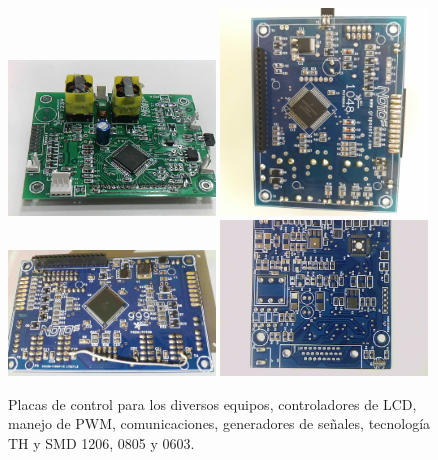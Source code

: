 \documentclass[11pt,a4paper,sans]{moderncv}  %
\begin{document}
   \begin{figure}
      \begin{center}
         \includegraphics[width=0.49\textwidth]{./portfolio/n1500.png}
         \includegraphics[width=0.49\textwidth]{./portfolio/lumiere.jpeg}
         \includegraphics[width=0.49\textwidth]{./portfolio/electroestimulador.jpg}
         \includegraphics[width=0.49\textwidth]{./portfolio/electro_portatil_virgen.jpeg}
      \end{center}
      \caption{Placas de control para los diversos equipos, controladores de LCD, manejo de PWM, comunicaciones, generadores de señales, tecnología TH y SMD 1206, 0805 y 0603.}
      \label{fig:noto2}
   \end{figure}
\end{document}
